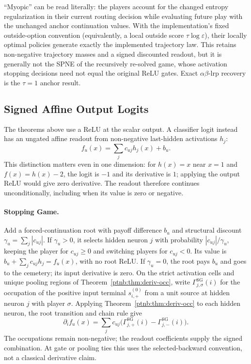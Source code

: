 ``Myopic'' can be read literally: the players account for the changed entropy regularization in their current routing decision while evaluating future play with the unchanged anchor continuation values. With the implementation's fixed outside-option convention (equivalently, a local outside score $\tau\log\varepsilon$), their locally optimal policies generate exactly the implemented trajectory law. This retains non-negative trajectory masses and a signed discounted readout, but it is generally not the SPNE of the recursively re-solved game, whose activation stopping decisions need not equal the original ReLU gates. Exact $\alpha\beta$-\ac{lrp} recovery is the $\tau=1$ anchor result.

\subsection{Signed Affine Output Logits}\label{ptnb:app:affine-readout}

The theorems above use a ReLU at the scalar output. A classifier logit instead has an ungated affine
readout from non-negative last-hidden activations $h_j$:
\begin{equation}\label{ptnb:eq:affine-readout}
 f_u(x)=\sum_j c_{uj}h_j(x)+b_u.
\end{equation}
This distinction matters even in one dimension: for $h(x)=x$ near $x=1$ and
$f(x)=h(x)-2$, the logit is $-1$ and its derivative is $1$; applying the output ReLU would give
zero derivative. The readout therefore continues unconditionally, including when its value is zero
or negative.

\paragraph{Stopping Game.}
Add a forced-continuation root with payoff difference $b_u$ and structural discount
$\gamma_u=\sum_j|c_{uj}|$. If $\gamma_u>0$, it selects hidden neuron $j$ with probability
$|c_{uj}|/\gamma_u$, keeping the player for $c_{uj}\geq0$ and switching players for $c_{uj}<0$.
Its value is $b_u+\sum_jc_{uj}h_j=f_u(x)$, with no root ReLU. If $\gamma_u=0$, the root pays
$b_u$ and goes to the cemetery; its input derivative is zero. On the strict activation cells and
unique pooling regions of Theorem~\ref{ptnb:thm:deriv-occ}, write
$\Gamma^{\mathrm{SG}}_{j,\sigma}(i)$ for the occupation of the positive input terminal
$s_{i,+}^{(0)}$ from a unit source at hidden neuron $j$ with player $\sigma$. Applying
Theorem~\ref{ptnb:thm:deriv-occ} to each hidden neuron, the root transition and chain rule give
\begin{equation}\label{ptnb:eq:affine-readout-gradient}
 \partial_i f_u(x)=\sum_j c_{uj}
 \bigl(\Gamma^{\mathrm{SG}}_{j,+}(i)-\Gamma^{\mathrm{SG}}_{j,-}(i)\bigr).
\end{equation}
The occupations remain non-negative; the readout coefficients supply the signed combination.
At gate or pooling ties this uses the selected-backward convention, not a classical derivative claim.

